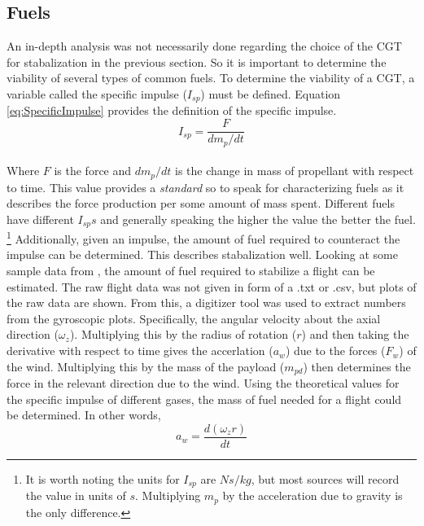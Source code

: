 \subsection{Fuels}\label{sec:Fuels}
An in-depth analysis was not necessarily done regarding the choice of the CGT for stabalization in the previous section. So it is important to determine the viability of several types of common fuels. To determine the viability of a CGT, a variable called the specific impulse ($I_{sp}$) must be defined. Equation \ref{eq:SpecificImpulse} provides the definition of the specific impulse.
\begin{equation}\label{eq:SpecificImpulse}
I_{sp}=\frac{F}{dm_p/dt}
\end{equation}%
%
%
%
\\
Where $F$ is the force and $dm_p/dt$ is the change in mass of propellant with respect to time. This value provides a \textit{standard} so to speak for characterizing fuels as it describes the force production per some amount of mass spent. Different fuels have different $I_{sp}s$ and generally speaking the higher the value the better the fuel. \footnote{It is worth noting the units for $I_{sp}$ are $Ns/kg$, but most sources will record the value in units of $s$. Multiplying $m_p$ by the acceleration due to gravity is the only difference.} Additionally, given an impulse, the amount of fuel required to counteract the impulse can be determined. This describes stabalization well. Looking at some sample data from \cite{titan1hab}, the amount of fuel required to stabilize a flight can be estimated. The raw flight data was not given in form of a .txt or .csv, but plots of the raw data are shown. From this, a digitizer tool was used to extract numbers from the gyroscopic plots. Specifically, the angular velocity about the axial direction ($\omega_z$). Multiplying this by the radius of rotation ($r$) and then taking the derivative with respect to time gives the accerlation ($a_w$) due to the forces ($F_w$) of the wind. Multiplying this by the mass of the payload ($m_{pd}$) then determines the force in the relevant direction due to the wind. Using the theoretical values for the specific impulse of different gases, the mass of fuel needed for a flight could be determined. In other words,
\begin{equation}\label{eq:alpha}
a_w = \frac{d(\omega_z r)}{dt}
\end{equation}%
